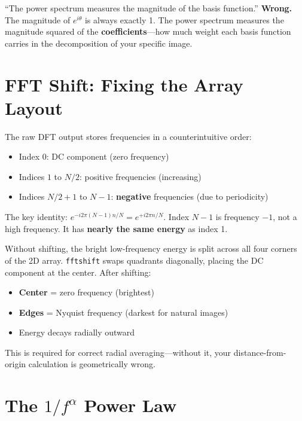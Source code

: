 \documentclass[11pt,a4paper]{article}
\theoremstyle{definition}
\begin{document}
\begin{pitfall}
``The power spectrum measures the magnitude of the basis function.'' \textbf{Wrong.} The magnitude of $e^{i\theta}$ is always exactly 1. The power spectrum measures the magnitude squared of the \textbf{coefficients}---how much weight each basis function carries in the decomposition of your specific image.
\end{pitfall}

\section{FFT Shift: Fixing the Array Layout}

The raw DFT output stores frequencies in a counterintuitive order:
\begin{itemize}
    \item Index $0$: DC component (zero frequency)
    \item Indices $1$ to $N/2$: positive frequencies (increasing)
    \item Indices $N/2+1$ to $N-1$: \textbf{negative} frequencies (due to periodicity)
\end{itemize}

The key identity: $e^{-i2\pi(N-1)n/N} = e^{+i2\pi n/N}$. Index $N-1$ is frequency $-1$, not a high frequency. It has \textbf{nearly the same energy} as index 1.

Without shifting, the bright low-frequency energy is split across all four corners of the 2D array. \texttt{fftshift} swaps quadrants diagonally, placing the DC component at the center. After shifting:
\begin{itemize}
    \item \textbf{Center} = zero frequency (brightest)
    \item \textbf{Edges} = Nyquist frequency (darkest for natural images)
    \item Energy decays radially outward
\end{itemize}

This is required for correct radial averaging---without it, your distance-from-origin calculation is geometrically wrong.

\section{The $1/f^\alpha$ Power Law}
\end{document}
